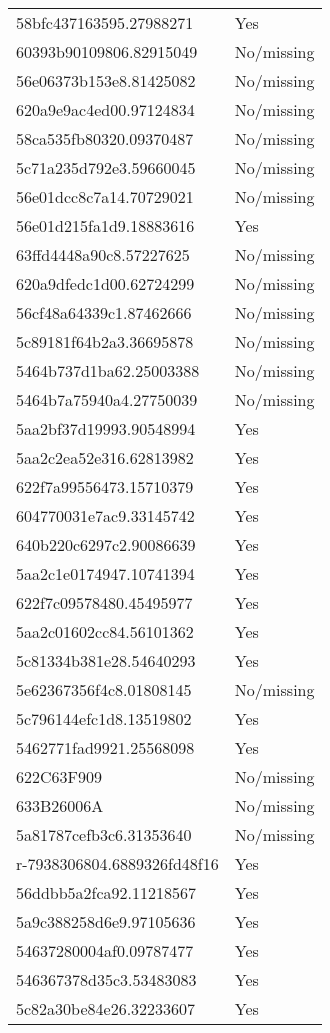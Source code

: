 \begin{tabular}{ll}
58bfc437163595.27988271 & Yes \\
60393b90109806.82915049 & No/missing \\
56e06373b153e8.81425082 & No/missing \\
620a9e9ac4ed00.97124834 & No/missing \\
58ca535fb80320.09370487 & No/missing \\
5c71a235d792e3.59660045 & No/missing \\
56e01dcc8c7a14.70729021 & No/missing \\
56e01d215fa1d9.18883616 & Yes \\
63ffd4448a90c8.57227625 & No/missing \\
620a9dfedc1d00.62724299 & No/missing \\
56cf48a64339c1.87462666 & No/missing \\
5c89181f64b2a3.36695878 & No/missing \\
5464b737d1ba62.25003388 & No/missing \\
5464b7a75940a4.27750039 & No/missing \\
5aa2bf37d19993.90548994 & Yes \\
5aa2c2ea52e316.62813982 & Yes \\
622f7a99556473.15710379 & Yes \\
604770031e7ac9.33145742 & Yes \\
640b220c6297c2.90086639 & Yes \\
5aa2c1e0174947.10741394 & Yes \\
622f7c09578480.45495977 & Yes \\
5aa2c01602cc84.56101362 & Yes \\
5c81334b381e28.54640293 & Yes \\
5e62367356f4c8.01808145 & No/missing \\
5c796144efc1d8.13519802 & Yes \\
5462771fad9921.25568098 & Yes \\
622C63F909 & No/missing \\
633B26006A & No/missing \\
5a81787cefb3c6.31353640 & No/missing \\
r-7938306804.6889326fd48f16 & Yes \\
56ddbb5a2fca92.11218567 & Yes \\
5a9c388258d6e9.97105636 & Yes \\
54637280004af0.09787477 & Yes \\
546367378d35c3.53483083 & Yes \\
5c82a30be84e26.32233607 & Yes \\

\end{tabular}
